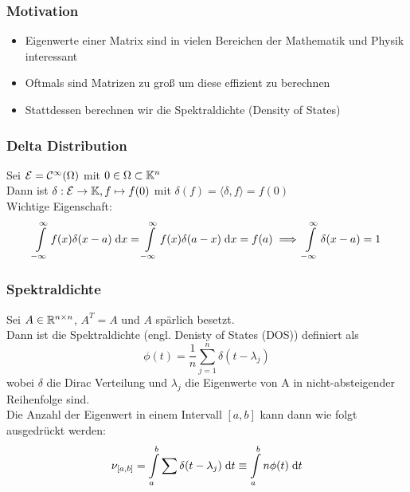 \begin{frame}
    \frametitle{Motivation}
    \begin{itemize}
        \item Eigenwerte einer Matrix sind in vielen Bereichen der Mathematik und Physik interessant
        \item Oftmals sind Matrizen zu groß um diese effizient zu berechnen
        \item Stattdessen berechnen wir die Spektraldichte (Density of States)
    \end{itemize}
\end{frame}

\begin{frame}
    \frametitle{Delta Distribution}
    Sei $\mathcal{E} = \mathcal{C}^{\infty}(\Omega)$ mit $0 \in \Omega \subset \mathbb{K}^n$\\
    Dann ist $\delta: \mathcal{E} \to \mathbb{K}, f \mapsto f(0)$ mit $\delta(f) = \langle \delta, f \rangle = f(0)$\\
    Wichtige Eigenschaft:
    $$\int\limits_{-\infty}^{\infty} f(x) \delta(x-a) \;\mathrm{d}x = \int\limits_{-\infty}^{\infty} f(x) \delta(a-x) \;\mathrm{d}x = f(a) \implies \int\limits_{-\infty}^{\infty} \delta(x-a) = 1$$
\end{frame}


\begin{frame}
    \frametitle{Spektraldichte}
    Sei $A \in \mathbb{R}^{n \times n}$, $A^T = A$ und $A$ spärlich besetzt.\\
    Dann ist die Spektraldichte (engl. Denisty of States (DOS)) definiert als 
    \begin{equation}
        \phi(t) = \frac{1}{n} \sum_{j=1}^{n} \delta(t - \lambda_j)
    \end{equation}
    wobei $\delta$ die Dirac Verteilung und $\lambda_j$ die Eigenwerte von A in nicht-absteigender Reihenfolge sind.\\
    Die Anzahl der Eigenwert in einem Intervall $[a, b]$ kann dann wie folgt ausgedrückt werden:
    \begin{equation} \label{eq:nuab}
        \nu_{[a, b]} = \int\limits_a^b \sum \delta(t - \lambda_j) \;\mathrm{d}t \equiv \int\limits_a^b n \phi(t) \;\mathrm{d}t
    \end{equation}
\end{frame}

